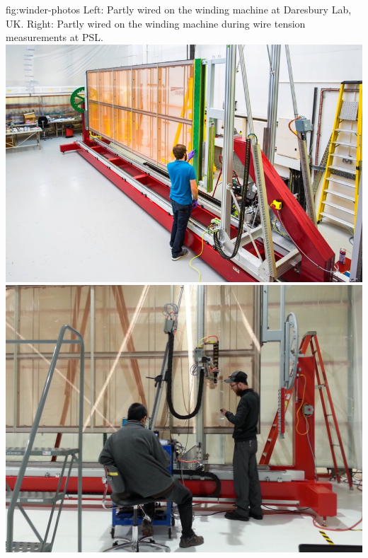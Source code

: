 \begin{dunefigure}{fig:winder-photos}
{Left: Partly wired   on the winding machine at Daresbury Lab, UK. Right: Partly wired   on the winding machine during wire tension measurements at PSL.}
\includegraphics[height=0.3\textheight,trim=25mm 0mm 4mm 0mm,clip]{graphics/sp-apa-on-winder-daresbury.jpg}
\includegraphics[height=0.3\textheight,trim=200mm 0mm 30mm 0mm,clip]{graphics/sp-apa-tension-testing-psl.jpg}
\end{dunefigure}

